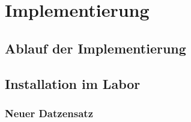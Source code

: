 \chapter{Implementierung} \label{chap:implementierung}


\section{Ablauf der Implementierung} \label{sec:ablauf_der_implementierung}


\section{Installation im Labor} \label{sec:installation_im_labor}

\subsection{Neuer Datzensatz} \label{subsec:neuer_datzensatz}